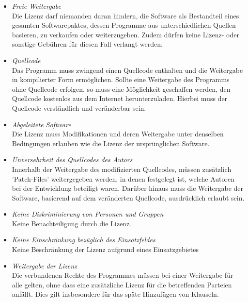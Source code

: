 \begin{itemize}
    \item \textit{Freie Weitergabe}\\
    Die Lizenz darf niemanden daran hindern, die Software als Bestandteil eines gesamten Softwarepaktes, dessen Programme aus unterschiedlichen Quellen basieren, zu verkaufen oder weiterzugeben. Zudem dürfen keine Lizenz- oder sonstige Gebühren für diesen Fall verlangt werden. 

    \item \textit{Quellcode}\\
    Das Programm muss zwingend einen Quellcode enthalten und die Weitergabe in kompilierter Form ermöglichen. Sollte eine Weitergabe des Programms ohne Quellcode erfolgen, so muss eine Möglichkeit geschaffen werden, den Quellcode kostenlos aus dem Internet herunterzuladen. Hierbei muss der Quellcode verständlich und veränderbar sein. 

    \item \textit{Abgeleitete Software}\\
    Die Lizenz muss Modifikationen und deren Weitergabe unter denselben Bedingungen erlauben wie die Lizenz der ursprünglichen Software. 

    \item \textit{Unversehrheit des Quellcodes des Autors}\\
    Innerhalb der Weitergabe des modifizierten Quellcodes, müssen zusätzlich 'Patch-Files' weitergegeben werden, in denen festgelegt ist, welche Autoren bei der Entwicklung beteiligt waren. Darüber hinaus muss die Weitergabe der Software, basierend auf dem veränderten Quellcode, ausdrücklich erlaubt sein. 

    \item \textit{Keine Diskriminierung von Personen und Gruppen}\\
    Keine Benachteiligung durch die Lizenz.
    
    \item \textit{Keine Einschränkung bezüglich des Einsatzfeldes}\\
    Keine Beschränkung der Lizenz aufgrund eines Einsatzgebietes  

    \item \textit{Weitergabe der Lizenz}\\
    Die verbundenen Rechte des Programmes müssen bei einer Weitergabe für alle gelten, ohne dass eine zusätzliche Lizenz für die betreffenden Parteien anfällt. Dies gilt insbesondere für das späte Hinzufügen von Klauseln. 


\end{itemize}
